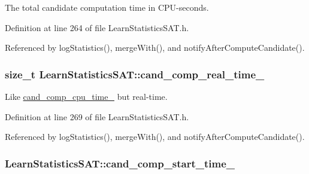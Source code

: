 The total candidate computation time in C\-P\-U-\/seconds. 



Definition at line 264 of file Learn\-Statistics\-S\-A\-T.\-h.



Referenced by log\-Statistics(), merge\-With(), and notify\-After\-Compute\-Candidate().

\hypertarget{classLearnStatisticsSAT_a278872231b15ff010ae4e3a60e8d8f11}{
\subsubsection[{cand\-\_\-comp\-\_\-real\-\_\-time\-\_\-}]{\setlength{\rightskip}{0pt plus 5cm}size\-\_\-t Learn\-Statistics\-S\-A\-T\-::cand\-\_\-comp\-\_\-real\-\_\-time\-\_\-\hspace{0.3cm}{\ttfamily [protected]}}}\label{classLearnStatisticsSAT_a278872231b15ff010ae4e3a60e8d8f11}


Like \hyperlink{classLearnStatisticsSAT_af977c00fbf0f9978f92dd5c997577a06}{cand\-\_\-comp\-\_\-cpu\-\_\-time\-\_\-} but real-\/time. 



Definition at line 269 of file Learn\-Statistics\-S\-A\-T.\-h.



Referenced by log\-Statistics(), merge\-With(), and notify\-After\-Compute\-Candidate().

\hypertarget{classLearnStatisticsSAT_a73f2f0e2ee619df05b22261e7b691320}{
\subsubsection[{cand\-\_\-comp\-\_\-start\-\_\-time\-\_\-}]{ Learn\-Statistics\-S\-A\-T\-::cand\-\_\-comp\-\_\-start\-\_\-time\-\_\-\hspace{0.3cm}{\ttfamily [protected]}}}\label{classLearnStatisticsSAT_a73f2f0e2ee619df05b22261e7b691320}


